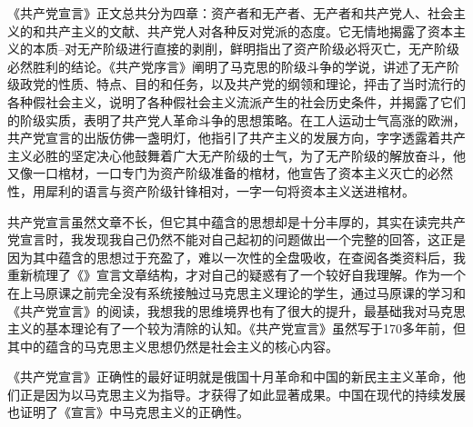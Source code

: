 \documentclass[a4paper,11pt,UTF8]{article}
\begin{document}
《共产党宣言》正文总共分为四章：资产者和无产者、无产者和共产党人、社会主义的和共产主义的文献、共产党人对各种反对党派的态度。它无情地揭露了资本主义的本质--对无产阶级进行直接的剥削，鲜明指出了资产阶级必将灭亡，无产阶级必然胜利的结论。《共产党序言》阐明了马克思的阶级斗争的学说，讲述了无产阶级政党的性质、特点、目的和任务，以及共产党的纲领和理论，抨击了当时流行的各种假社会主义，说明了各种假社会主义流派产生的社会历史条件，并揭露了它们的阶级实质，表明了共产党人革命斗争的思想策略。在工人运动士气高涨的欧洲，共产党宣言的出版仿佛一盏明灯，他指引了共产主义的发展方向，字字透露着共产主义必胜的坚定决心他鼓舞着广大无产阶级的士气，为了无产阶级的解放奋斗，他又像一口棺材，一口专门为资产阶级准备的棺材，他宣告了资本主义灭亡的必然性，用犀利的语言与资产阶级针锋相对，一字一句将资本主义送进棺材。

共产党宣言虽然文章不长，但它其中蕴含的思想却是十分丰厚的，其实在读完共产党宣言时，我发现我自己仍然不能对自己起初的问题做出一个完整的回答，这正是因为其中蕴含的思想过于充盈了，难以一次性的全盘吸收，在查阅各类资料后，我重新梳理了《》宣言文章结构，才对自己的疑惑有了一个较好自我理解。作为一个在上马原课之前完全没有系统接触过马克思主义理论的学生，通过马原课的学习和《共产党宣言》的阅读，我想我的思维境界也有了很大的提升，最基础我对马克思主义的基本理论有了一个较为清除的认知。《共产党宣言》虽然写于170多年前，但其中的蕴含的马克思主义思想仍然是社会主义的核心内容。

《共产党宣言》正确性的最好证明就是俄国十月革命和中国的新民主主义革命，他们正是因为以马克思主义为指导。才获得了如此显著成果。中国在现代的持续发展也证明了《宣言》中马克思主义的正确性。
\end{document}
